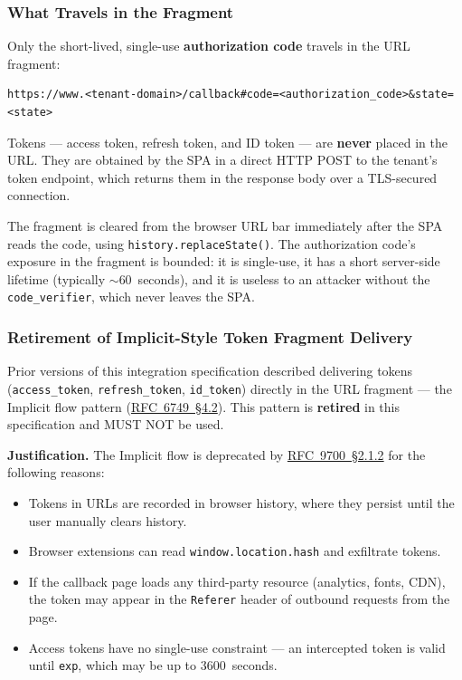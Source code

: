 \subsubsection{What Travels in the Fragment}

Only the short-lived, single-use \textbf{authorization code} travels in the URL fragment:


\begin{lstlisting}[basicstyle=\footnotesize\ttfamily]
https://www.<tenant-domain>/callback#code=<authorization_code>&state=<state>
\end{lstlisting}

Tokens --- access token, refresh token, and ID token --- are \textbf{never} placed in the
URL. They are obtained by the SPA in a direct HTTP POST to the tenant's token endpoint,
which returns them in the response body over a TLS-secured connection.

The fragment is cleared from the browser URL bar immediately after the SPA reads the
code, using \texttt{history.replaceState()}. The authorization code's exposure in the
fragment is bounded: it is single-use, it has a short server-side lifetime (typically
$\sim$60~seconds), and it is useless to an attacker without the \texttt{code\_verifier},
which never leaves the SPA.

\subsubsection{Retirement of Implicit-Style Token Fragment Delivery}

Prior versions of this integration specification described delivering tokens
(\texttt{access\_token}, \texttt{refresh\_token}, \texttt{id\_token}) directly in the
URL fragment --- the Implicit flow pattern (\href{https://tools.ietf.org/html/rfc6749#section-4.2}{RFC~6749~\S4.2}). This pattern is
\textbf{retired} in this specification and MUST NOT be used.

\textbf{Justification.} The Implicit flow is deprecated by 
\href{https://tools.ietf.org/html/rfc9700#section-2.1.2}{RFC~9700~\S2.1.2} for the
following reasons:

\begin{itemize}
  \item Tokens in URLs are recorded in browser history, where they persist until the user
    manually clears history.
  \item Browser extensions can read \texttt{window.location.hash} and exfiltrate tokens.
  \item If the callback page loads any third-party resource (analytics, fonts, CDN), the
    token may appear in the \texttt{Referer} header of outbound requests from the page.
  \item Access tokens have no single-use constraint --- an intercepted token is valid until
    \texttt{exp}, which may be up to 3600~seconds.
\end{itemize}

